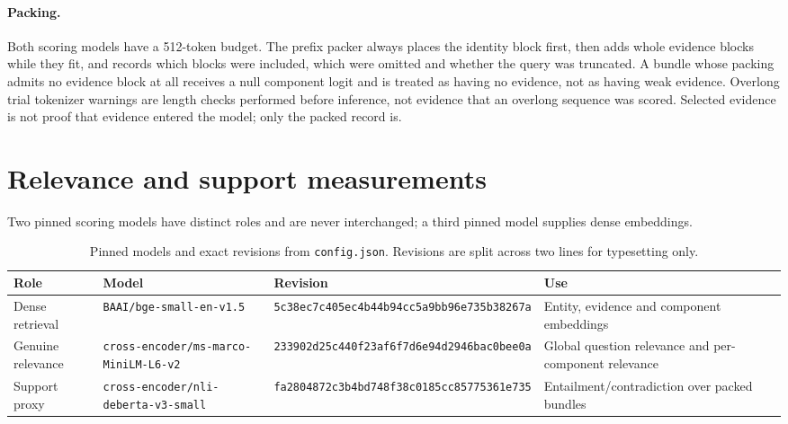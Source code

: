 \documentclass[11pt,a4paper]{article}
\begin{document}
\paragraph{Packing.} Both scoring models have a 512-token budget. The prefix packer always places the identity block first, then adds whole evidence blocks while they fit, and records which blocks were included, which were omitted and whether the query was truncated. A bundle whose packing admits no evidence block at all receives a null component logit and is treated as having no evidence, not as having weak evidence. Overlong trial tokenizer warnings are length checks performed before inference, not evidence that an overlong sequence was scored. Selected evidence is not proof that evidence entered the model; only the packed record is.

\section{Relevance and support measurements}
\label{sec:models}

Two pinned scoring models have distinct roles and are never interchanged; a third pinned model supplies dense embeddings.

\begin{table}[htbp]
\centering
\footnotesize
\caption{Pinned models and exact revisions from \texttt{config.json}. Revisions are split across two lines for typesetting only.}
\label{tab:models}
\begin{tabular}{@{}p{2.4cm}p{4.4cm}p{3.4cm}p{4.3cm}@{}}
\toprule
Role & Model & Revision & Use \\
\midrule
Dense retrieval & \texttt{BAAI/bge-small-en-v1.5} & \texttt{5c38ec7c405ec4b44b94}\newline\texttt{cc5a9bb96e735b38267a} & Entity, evidence and component embeddings \\
Genuine relevance & \texttt{cross-encoder/}\newline\texttt{ms-marco-MiniLM-L6-v2} & \texttt{233902d25c440f23af6f}\newline\texttt{7d6e94d2946bac0bee0a} & Global question relevance and per-component relevance \\
Support proxy & \texttt{cross-encoder/}\newline\texttt{nli-deberta-v3-small} & \texttt{fa2804872c3b4bd748f3}\newline\texttt{8c0185cc85775361e735} & Entailment/contradiction over packed bundles \\
\bottomrule
\end{tabular}
\end{table}
\end{document}
